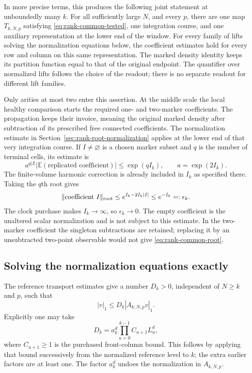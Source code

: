 In more precise terms, this produces the following joint statement at
unboundedly many $k$. For all sufficiently large $N$, and every $p$, there
are one map $T_{k,N,p}$ satisfying \eqref{eq:rank-common-tested}, one
integration course, and one auxiliary representation at the lower end
of the window. For every family of lifts solving the normalization
equations below, the coefficient estimates hold for every row and column
on this same representation. The marked density identity keeps its
partition function equal to that of the original endpoint. The
quantifier over normalized lifts follows the choice of the readout;
there is no separate readout for different lift families.

Only arities at most two enter this assertion. At the middle scale the
local healthy comparison starts the required one- and two-marker
coefficients. The propagation keeps their invoice, meaning the original
marked density after subtraction of its prescribed free connected
coefficients. The normalization estimate in
Section~\ref{sec:rank-root-normalization} applies at the lower end of
that very integration course. If $I\ne\varnothing$ is a chosen marker
subset and $q$ is the number of terminal cells, its estimate is
\[
 a^{q|I|}|\mathbb E(\text{replicated coefficient})|
       \le \exp(q I_k),\qquad a=\exp(2I_k).
\]
The finite-volume harmonic correction is already included in $I_k$ as
specified there. Taking the $q$th root gives
\begin{equation}\label{eq:rank-common-root}
       \|\text{coefficient }I\|_{\rm root}
       \le e^{I_k-2I_k|I|}\le e^{-I_k}=:\epsilon_k.
\end{equation}
The clock purchase makes $I_k\to\infty$, so $\epsilon_k\to0$.
The empty coefficient is the unaltered scalar normalization and is not
subject to this estimate. In the two-marker coefficient the singleton
subtractions are retained; replacing it by an unsubtracted two-point
observable would not give \eqref{eq:rank-common-root}.

\subsection{Solving the normalization equations exactly}

The reference transport estimates give a number $D_k>0$, independent of
$N\ge k$ and $p$, such that
\begin{equation}\label{eq:rank-reference-inverse}
                       |v|_1\le D_k|A_{k,N,p}v|_1.
\end{equation}
Explicitly one may take
\[
 D_k=a_k^d\prod_{u=0}^{k-1} C_{u+1}L_u^d,
\]
where $C_{u+1}\ge1$ is the purchased front-column bound. This follows
by applying that bound successively from the normalized reference level
to $k$; the extra earlier factors are at least one. The factor $a_k^d$
undoes the normalization in $A_{k,N,p}$.

